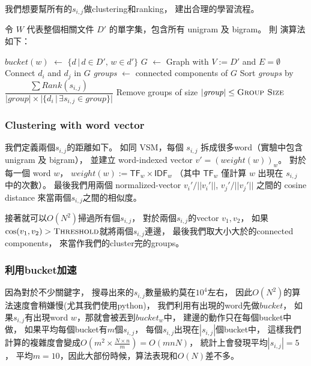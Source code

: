 我們想要幫所有的$s_{i,j}$做clustering和ranking，
建出合理的學習流程。

令 $W$ 代表整個相關文件 $D'$ 的單字集，包含所有 unigram 及 bigram。
則  演算法如下：

\begin{algorithmic}
      \State $\mathit{bucket}(w)$ $\gets$ $\{d\,|\,d\in D',\,w\in d'\}$
    \EndFor
    \State $G$ $\gets$ Graph with $V:=D'$ and $E=\emptyset$
        \State Connect $d_i$ and $d_j$ in $G$
      \EndFor
    \EndFor
    \State \textit{groups} $\gets$ connected components of $G$
    \State
    \State Sort \textit{groups} by $\dfrac{\sum \mathit{Rank}(s_{i,j})}{|\mathit{group}|\times |\{d_i \,|\, \exists s_{i,j} \in group\}|}$
    \State
    \State Remove groups of size $|\mathit{group}|\le\text{\textproc{Group Size}}$
  \EndFunction
\end{algorithmic}


\subsubsection{Clustering with word vector}

我們定義兩個$s_{i,j}$的距離如下。
如同 VSM，每個 $s_{i,j}$ 拆成很多word（實驗中包含 unigram 及 bigram），
並建立 word-indexed vector $v' = (\mathit{weight}(w))_w$。
對於每一個 word $w$， $\mathit{weight}(w):=\mathsf{TF}_w\times\mathsf{IDF}_w$
（其中 $\mathsf{TF}_w$ 僅計算 $w$ 出現在 $s_{i,j}$ 中的次數）。
最後我們用兩個 normalized-vector $v_i'/||v_i'||$, $v_j'/||v_j'||$ 之間的 cosine distance 來當兩個$s_{i,j}$之間的相似度。

接著就可以$O(N^{2})$掃過所有個$s_{i,j}$，
對於兩個$s_{i,j}$的vector $v_1,v_2$，
如果$\cos(v_1,v_2) > \text{\textproc{Threshold}}$就將兩個$s_{i,j}$連邊，
最後我們取大小大於的connected components，
來當作我們的cluster完的groups。

\subsubsection{利用bucket加速}
因為對於不少關鍵字，
搜尋出來的$s_{i,j}$數量級約莫在$10^4$左右，
因此$O(N^{2})$的算法速度會稍嫌慢(尤其我們使用python)，
我們利用有出現的word先做$\mathit{bucket}$，
如果$s_{i,j}$有出現word $w$，那就會被丟到$bucket_w$中，
建邊的動作只在每個bucket中做，
如果平均每個bucket有$m$個$s_{i,j}$，
每個$s_{i,j}$出現在$|s_{i,j}|$個bucket中，
這樣我們計算的複雜度會變成$O(m^2\times \frac{N\times n}{m}) = O(mnN)$，
統計上會發現平均$|s_{i,j}| = 5$，
平均$m = 10$，因此大部份時候，算法表現和$O(N)$差不多。

